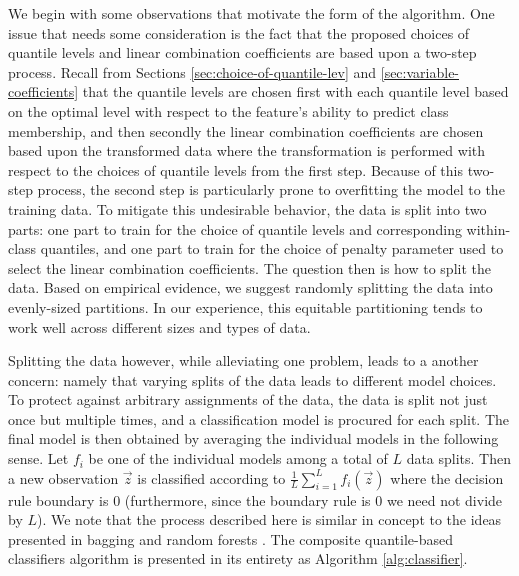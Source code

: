 We begin with some observations that motivate the form of the algorithm.  One
issue that needs some consideration is the fact that the proposed choices of
quantile levels and linear combination coefficients are based upon a two-step
process.  Recall from Sections \ref{sec:choice-of-quantile-lev} and
\ref{sec:variable-coefficients} that the quantile levels are chosen first with
each quantile level based on the optimal level with respect to the feature's
ability to predict class membership, and then secondly the linear combination
coefficients are chosen based upon the transformed data where the transformation
is performed with respect to the choices of quantile levels from the first step.
Because of this two-step process, the second step is particularly prone to
overfitting the model to the training data.  To mitigate this undesirable
behavior, the data is split into two parts: one part to train for the choice of
quantile levels and corresponding within-class quantiles, and one part to train
for the choice of penalty parameter used to select the linear combination
coefficients.  The question then is how to split the data.  Based on empirical
evidence, we suggest randomly splitting the data into evenly-sized partitions.
In our experience, this equitable partitioning tends to work well across
different sizes and types of data.

Splitting the data however, while alleviating one problem, leads to a another
concern: namely that varying splits of the data leads to different model
choices.  To protect against arbitrary assignments of the data, the data is
split not just once but multiple times, and a classification model is procured
for each split.  The final model is then obtained by averaging the individual
models in the following sense.  Let $f_i$ be one of the individual models among
a total of $L$ data splits.  Then a new observation $\vec{z}$ is classified
according to $\frac{1}{L} \sum_{i=1}^L f_i(\vec{z})$ where the decision rule
boundary is 0 (furthermore, since the boundary rule is 0 we need not divide by
$L$).  We note that the process described here is similar in concept to the
ideas presented in bagging \cite{breiman1996} and random forests
\cite{breiman2001}.  The composite quantile-based classifiers algorithm is
presented in its entirety as Algorithm \ref{alg:classifier}.


  

